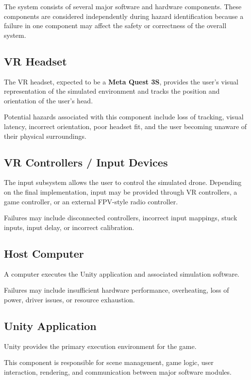 \documentclass{article}
\begin{document}
The system consists of several major software and hardware components. These
components are considered independently during hazard identification because a
failure in one component may affect the safety or correctness of the overall
system.

\subsection{VR Headset}

The VR headset, expected to be a \textbf{Meta Quest 3S}, provides the user's
visual representation of the simulated environment and tracks the position and
orientation of the user's head.

Potential hazards associated with this component include loss of tracking,
visual latency, incorrect orientation, poor headset fit, and the user becoming
unaware of their physical surroundings.

\subsection{VR Controllers / Input Devices}

The input subsystem allows the user to control the simulated drone. Depending
on the final implementation, input may be provided through VR controllers, a
game controller, or an external FPV-style radio controller.

Failures may include disconnected controllers, incorrect input mappings, stuck
inputs, input delay, or incorrect calibration.

\subsection{Host Computer}

A computer executes the Unity application and associated simulation software.

Failures may include insufficient hardware performance, overheating, loss of
power, driver issues, or resource exhaustion.

\subsection{Unity Application}

Unity provides the primary execution environment for the game.

This component is responsible for scene management, game logic, user
interaction, rendering, and communication between major software modules.
\end{document}
